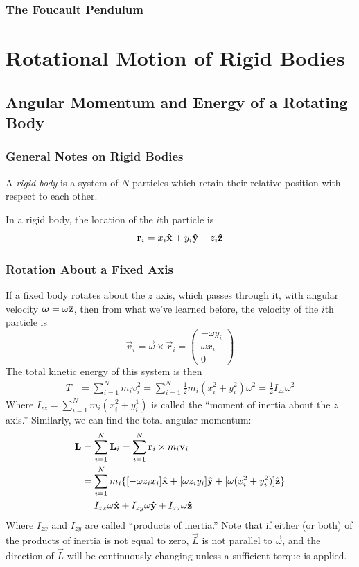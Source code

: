 \documentclass[a4paper]{article}
\begin{document}
\subsubsection{The Foucault Pendulum}

\section{Rotational Motion of Rigid Bodies}
\subsection{Angular Momentum and Energy of a Rotating Body}
\subsubsection{General Notes on Rigid Bodies}
\begin{defi}
	A \emph{rigid body} is a system of $N$ particles which retain their
	relative position with respect to each other.
\end{defi}
In a rigid body, the location of the $i$th particle is
\[ \boldsymbol{\mathbf{r}}_i = x_i\boldsymbol{\mathbf{\hat{x}}}+y_i\boldsymbol{\mathbf{\hat{y}}}+z_i\boldsymbol{\mathbf{\hat{z}}} \]

\subsubsection{Rotation About a Fixed Axis}
If a fixed body rotates about the $z$ axis, which passes through it, with
angular velocity $\boldsymbol{\mathbf{\omega}} = \omega\boldsymbol{\mathbf{\hat{z}}}$, then from what we've learned
before, the velocity of the $i$th particle is
\[ \vec{v}_i = \vec{\omega}\times\vec{r}_i = \begin{pmatrix}-\omega y_i\\\omega
x_i\\0\end{pmatrix}\]
The total kinetic energy of this system is then
\begin{align*}
	T &= \sum_{i=1}^{N}m_iv_i^2
	  = \sum_{i=1}^{N} \frac{1}{2}m_i(x_i^2+y_i^2)\omega^2
	  = \frac{1}{2}I_{zz}\omega^2
\end{align*}
Where $I_{zz} = \sum_{i=1}^{N} m_i(x_i^2+y_i^1)$ is called the ``moment of
inertia about the $z$ axis.'' Similarly, we can find the total angular
momentum:
\begin{align*}
	\boldsymbol{\mathbf{L}} &= \sum_{i=1}^{N} \boldsymbol{\mathbf{L}}_i = \sum_{i=1}^{N} \boldsymbol{\mathbf{r}}_i\times
	m_i\boldsymbol{\mathbf{v}}_i\\
	& = \sum_{i=1}^{N} m_i\{[-\omega z_ix_i]\boldsymbol{\mathbf{\hat{x}}}+[\omega z_iy_i]\boldsymbol{\mathbf{\hat{y}}} +
	[\omega(x_i^2+y_i^2)]\boldsymbol{\mathbf{\hat{z}}}\}\\
	&= I_{zx}\omega\boldsymbol{\mathbf{\hat{x}}} + I_{zy}\omega\boldsymbol{\mathbf{\hat{y}}}+I_{zz}\omega\boldsymbol{\mathbf{\hat{z}}}
\end{align*}
Where $I_{zx}$ and $I_{zy}$ are called ``products of inertia.'' Note that if
either (or both) of the products of inertia is not equal to zero, $\vec{L}$ is
not parallel to $\vec{\omega}$, and the direction of $\vec{L}$ will be
continuously changing unless a sufficient torque is applied.
\end{document}
